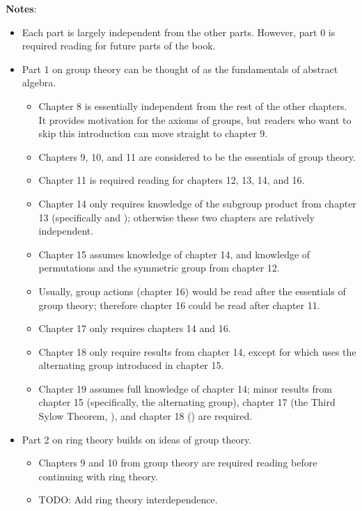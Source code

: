 \newpage
\begin{center}
\end{center}

\newpage

\textbf{Notes}:
\begin{itemize}
    \item Each part is largely independent from the other parts. However, part 0 is required reading for future parts of the book.
    \item Part 1 on group theory can be thought of as the fundamentals of abstract algebra.
    \begin{itemize}
        \item Chapter 8 is essentially independent from the rest of the other chapters. It provides motivation for the axioms of groups, but readers who want to skip this introduction can move straight to chapter 9.
        \item Chapters 9, 10, and 11 are considered to be the essentials of group theory.
        \item Chapter 11 is required reading for chapters 12, 13, 14, and 16.
        \item Chapter 14 only requires knowledge of the subgroup product from chapter 13 (specifically  and ); otherwise these two chapters are relatively independent.
        \item Chapter 15 assumes knowledge of chapter 14, and knowledge of permutations and the symmetric group from chapter 12.
        \item Usually, group actions (chapter 16) would be read after the essentials of group theory; therefore chapter 16 could be read after chapter 11.
        \item Chapter 17 only requires chapters 14 and 16.
        \item Chapter 18 only require results from chapter 14, except for  which uses the alternating group introduced in chapter 15.
        \item Chapter 19 assumes full knowledge of chapter 14; minor results from chapter 15 (specifically, the alternating group), chapter 17 (the Third Sylow Theorem, ), and chapter 18 () are required.
    \end{itemize}
    \item Part 2 on ring theory builds on ideas of group theory.
    \begin{itemize}
        \item Chapters 9 and 10 from group theory are required reading before continuing with ring theory.
        \item TODO: Add ring theory interdependence.
    \end{itemize}
\end{itemize}
